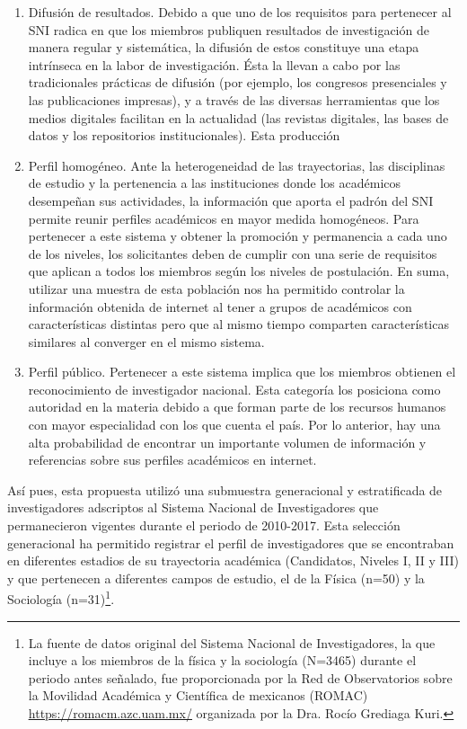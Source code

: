 \documentclass[
]{interact}
\begin{document}
\begin{enumerate}
\def\labelenumi{\arabic{enumi}.}
\item
  Difusión de resultados. Debido a que uno de los requisitos para
  pertenecer al SNI radica en que los miembros publiquen resultados de
  investigación de manera regular y sistemática, la difusión de estos
  constituye una etapa intrínseca en la labor de investigación. Ésta la
  llevan a cabo por las tradicionales prácticas de difusión (por
  ejemplo, los congresos presenciales y las publicaciones impresas), y a
  través de las diversas herramientas que los medios digitales facilitan
  en la actualidad (las revistas digitales, las bases de datos y los
  repositorios institucionales). Esta producción
\item
  Perfil homogéneo. Ante la heterogeneidad de las trayectorias, las
  disciplinas de estudio y la pertenencia a las instituciones donde los
  académicos desempeñan sus actividades, la información que aporta el
  padrón del SNI permite reunir perfiles académicos en mayor medida
  homogéneos. Para pertenecer a este sistema y obtener la promoción y
  permanencia a cada uno de los niveles, los solicitantes deben de
  cumplir con una serie de requisitos que aplican a todos los miembros
  según los niveles de postulación. En suma, utilizar una muestra de
  esta población nos ha permitido controlar la información obtenida de
  internet al tener a grupos de académicos con características distintas
  pero que al mismo tiempo comparten características similares al
  converger en el mismo sistema.
\item
  Perfil público. Pertenecer a este sistema implica que los miembros
  obtienen el reconocimiento de investigador nacional. Esta categoría
  los posiciona como autoridad en la materia debido a que forman parte
  de los recursos humanos con mayor especialidad con los que cuenta el
  país. Por lo anterior, hay una alta probabilidad de encontrar un
  importante volumen de información y referencias sobre sus perfiles
  académicos en internet.
\end{enumerate}

Así pues, esta propuesta utilizó una submuestra generacional y
estratificada de investigadores adscriptos al Sistema Nacional de
Investigadores que permanecieron vigentes durante el periodo de
2010-2017. Esta selección generacional ha permitido registrar el perfil
de investigadores que se encontraban en diferentes estadios de su
trayectoria académica (Candidatos, Niveles I, II y III) y que pertenecen
a diferentes campos de estudio, el de la Física (n=50) y la Sociología
(n=31)\footnote{La fuente de datos original del Sistema Nacional de
  Investigadores, la que incluye a los miembros de la física y la
  sociología (N=3465) durante el periodo antes señalado, fue
  proporcionada por la Red de Observatorios sobre la Movilidad Académica
  y Científica de mexicanos (ROMAC)
  \href{https://romacm.azc.uam.mx/}{\ul{https://romacm.azc.uam.mx/}}
  organizada por la Dra. Rocío Grediaga Kuri.}.
\end{document}

